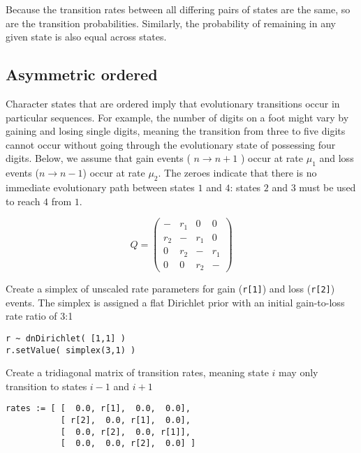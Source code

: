 Because the transition rates between all differing pairs of states are the same, so are the transition probabilities.
Similarly, the probability of remaining in any given state is also equal across states.

\subsection{Asymmetric ordered}

Character states that are ordered imply that evolutionary transitions occur in particular sequences.
For example, the number of digits on a foot might vary by gaining and losing single digits, meaning the transition from three to five digits cannot occur without going through the evolutionary state of possessing four digits.
Below, we assume that gain events ( $n \rightarrow n+1$ ) occur at rate $\mu_1$ and loss events ($n \rightarrow n-1$) occur at rate $\mu_2$.
The zeroes indicate that there is no immediate evolutionary path between states $1$ and $4$: states $2$ and $3$ must be used to reach $4$ from $1$.

\begin{equation*}
Q = \begin{pmatrix}
- & r_1 & 0 & 0 \\
r_2 & -   & r_1 & 0 \\
0 & r_2 & -   & r_1 \\
0 & 0 & r_2 & - 
\end{pmatrix}
\end{equation*}


Create a simplex of unscaled rate parameters for gain ({\tt r[1]}) and loss ({\tt r[2]}) events.
The simplex is assigned a flat Dirichlet prior with an initial gain-to-loss rate ratio of 3:1

{\tt \begin{snugshade*}
\begin{lstlisting}
r ~ dnDirichlet( [1,1] )
r.setValue( simplex(3,1) )
\end{lstlisting}
\end{snugshade*}}

Create a tridiagonal matrix of transition rates, meaning state $i$ may only transition to states $i-1$ and $i+1$

{\tt \begin{snugshade*}
\begin{lstlisting}
rates := [ [  0.0, r[1],  0.0,  0.0],
           [ r[2],  0.0, r[1],  0.0],
           [  0.0, r[2],  0.0, r[1]],
           [  0.0,  0.0, r[2],  0.0] ]
\end{lstlisting}
\end{snugshade*}}

